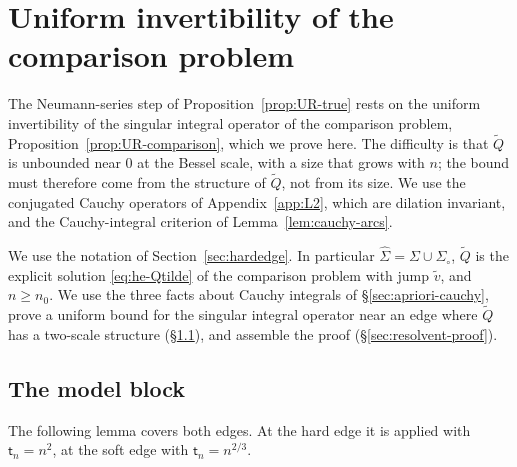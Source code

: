 
\section{Uniform invertibility of the comparison problem}\label{app:resolvent}

The Neumann-series step of Proposition~\ref{prop:UR-true} rests on the uniform invertibility of the singular
integral operator of the comparison problem, Proposition~\ref{prop:UR-comparison}, which we prove here. The difficulty
is that $\tilde Q$ is unbounded near $0$ at the Bessel scale, with a size that grows with $n$; the bound must therefore
come from the structure of $\tilde Q$, not from its size. We use the conjugated Cauchy operators of
Appendix~\ref{app:L2}, which are dilation invariant, and the Cauchy-integral criterion of Lemma~\ref{lem:cauchy-arcs}.

We use the notation of Section~\ref{sec:hardedge}. In particular $\hat\Sigma=\Sigma\cup\Sigma_{\circ}$, $\tilde Q$ is the explicit
solution \eqref{eq:he-Qtilde} of the comparison problem with jump $\tilde v$, and $n\ge n_0$. We use the three facts
about Cauchy integrals of \S\ref{sec:apriori-cauchy}, prove a uniform bound for the singular integral operator near an edge
where $\tilde Q$ has a two-scale structure (\S\ref{sec:resolvent-block}), and assemble the proof (\S\ref{sec:resolvent-proof}).

\subsection{The model block}\label{sec:resolvent-block}

The following lemma covers both edges. At the hard edge it is applied with $\mathsf t_n=n^2$, at the soft edge with
$\mathsf t_n=n^{2/3}$.

